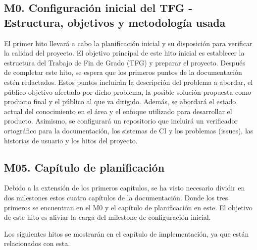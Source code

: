 \subsection{M0. Configuración inicial del TFG - Estructura, objetivos y metodología usada}
El primer hito llevará a cabo la planificación inicial y su disposición para verificar la calidad del
proyecto.
El objetivo principal de este hito inicial es establecer la estructura del Trabajo de Fin de Grado (TFG) y preparar el proyecto. Después de completar este hito, se espera que los primeros puntos de la documentación estén redactados. Estos puntos incluirán la descripción del problema a abordar, el público objetivo afectado por dicho problema, la posible solución propuesta como producto final y el público al que va dirigido. Además, se abordará el estado actual del conocimiento en el área y el enfoque utilizado para desarrollar el producto. Asimismo, se configurará un repositorio que incluirá un verificador ortográfico para la documentación, los sistemas de CI y los problemas (issues), las historias de usuario y los hitos del proyecto.

\subsection{M05. Capítulo de planificación}
Debido a la extensión de los primeros capítulos, se ha visto necesario dividir en dos milestones estos cuatro capítulos de la documentación. Donde los tres primeros se encuentran en el M0 y el capítulo de planificación en este.
El objetivo de este hito es aliviar la carga del milestone de configuración inicial.\vspace{0.5cm}

Los siguientes hitos se mostrarán en el capítulo de implementación, ya que están relacionados con esta.







